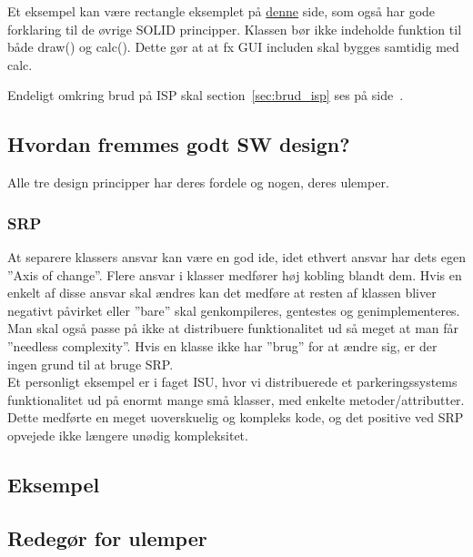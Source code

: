 Et eksempel kan være rectangle eksemplet på  \href{http://code.tutsplus.com/tutorials/solid-part-3-liskov-substitution-interface-segregation-principles--net-36710}{denne} side, som også har gode forklaring til de øvrige SOLID principper. Klassen bør ikke indeholde funktion til både draw() og calc(). Dette gør at at fx GUI includen skal bygges samtidig med calc.

Endeligt omkring brud på ISP skal section~\ref{sec:brud_isp} ses på side~\pageref{sec:brud_isp}.




\subsection{Hvordan fremmes godt SW design?}
Alle tre design principper har deres fordele og nogen, deres ulemper.

\subsubsection{SRP}
At separere klassers ansvar kan være en god ide, idet ethvert ansvar har dets egen ''Axis of change''. Flere ansvar i klasser medfører høj kobling blandt dem. Hvis en enkelt af disse ansvar skal ændres kan det medføre at resten af klassen bliver negativt påvirket eller ''bare'' skal genkompileres, gentestes og genimplementeres.\\

Man skal også passe på ikke at distribuere funktionalitet ud så meget at man får ”needless complexity”. Hvis en klasse ikke har ”brug” for at ændre sig, er der ingen grund til at bruge SRP.\\

Et personligt eksempel  er i faget ISU, hvor vi distribuerede et parkeringssystems funktionalitet ud på enormt mange små klasser, med enkelte metoder/attributter. Dette medførte en meget uoverskuelig og kompleks kode, og det positive ved SRP opvejede ikke længere unødig kompleksitet.


\subsection{Eksempel}

\subsection{Redegør for ulemper}